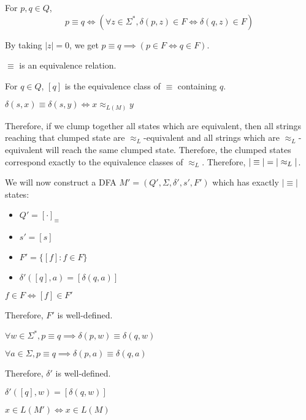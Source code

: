 \begin{definition} For $p, q \in Q$,
\[ p \equiv q \iff (\forall z \in \Sigma^*, \delta(p, z) \in F \iff \delta(q, z) \in F) \]
\end{definition}
\begin{theorem}By taking $|z| = 0$, we get $p \equiv q \implies (p \in F \iff q \in F)$.\end{theorem}

\begin{theorem}$\equiv$ is an equivalence relation.\end{theorem}
\begin{definition}For $q \in Q$, $[q]$ is the equivalence class of $\equiv$ containing $q$.\end{definition}
\begin{theorem}$\delta(s, x) \equiv \delta(s, y) \iff x \approx_{L(M)} y$\end{theorem}

Therefore, if we clump together all states which are equivalent,
then all strings reaching that clumped state are $\approx_L$-equivalent
and all strings which are $\approx_L$-equivalent will reach the same clumped state.
Therefore, the clumped states correspond exactly to the equivalence classes of $\approx_L$.
Therefore, $|\nobreak\equiv\nobreak| = |\nobreak\approx_L\nobreak|$.

We will now construct a DFA $M' = (Q', \Sigma, \delta', s', F')$
which has exactly $|\equiv|$ states:
\begin{itemize}
\item $Q' = [\cdot]_{\equiv}$
\item $s' = [s]$
\item $F' = \{ [f]: f \in F \}$
\item $\delta'([q], a) = [\delta(q, a)]$
\end{itemize}

\begin{theorem}$f \in F \iff [f] \in F'$\end{theorem}
Therefore, $F'$ is well-defined.
\begin{theorem}$\forall w \in \Sigma^*, p \equiv q \implies \delta(p, w) \equiv \delta(q, w)$\end{theorem}
\begin{corollary}$\forall a \in \Sigma, p \equiv q \implies \delta(p, a) \equiv \delta(q, a)$\end{corollary}
Therefore, $\delta'$ is well-defined.
\begin{theorem}$\delta'([q], w) = [\delta(q, w)]$\end{theorem}
\begin{theorem}$x \in L(M') \iff x \in L(M)$\end{theorem}

